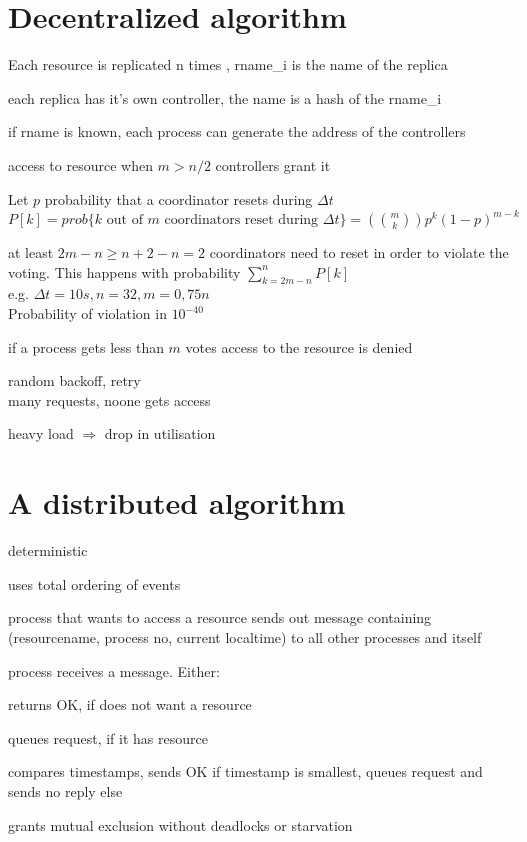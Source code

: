 \documentclass[ngerman,a4paper]{report}
\begin{document}
\section{Decentralized algorithm}
\begin{compactitem}
	\item Each resource is replicated n times , rname\_i is the name of the replica\\
	\item each replica has it's own controller, the name is a hash of the rname\_i
	\item if rname is known, each process can generate the address of the controllers				
	\item access to resource when $m>n/2$ controllers grant it
	\item Let $p$ probability that a coordinator resets during $\Delta t$\\
		$P[k]= prob\lbrace k \text{ out of } m \text{ coordinators reset during } \Delta t\rbrace = \left( \binom{m}{k}\right) p^k (1-p)^{m-k}$
	\item at least $2m-n\geq n+2-n=2$ coordinators need to reset in order to violate the voting. This happens with probability $\sum\limits_{k=2m-n}^n P[k]$\\
		e.g. $\Delta t = 10s, n=32, m=0,75n$\\
		Probability of violation in $10^{-40}$
	\item if a process gets less than $m$ votes access to the resource is denied
	\item random backoff, retry\\
		many requests, noone gets access
	\item heavy load $\Rightarrow$ drop in utilisation
\end{compactitem}

\section{A distributed algorithm}
\begin{compactitem}
	\item deterministic
	\item uses total ordering of events
	\item process that wants to access a resource sends out message containing (resourcename, process no, current localtime) to all other processes and itself
	\item process receives a message. Either:\\
		\begin{compactenum}
			\item returns OK, if does not want a resource
			\item queues request, if it has resource
			\item compares timestamps, sends OK if timestamp is smallest, queues request and sends no reply else
		\end{compactenum}
	\item grants mutual exclusion without deadlocks or starvation
\end{compactitem}
\end{document}
